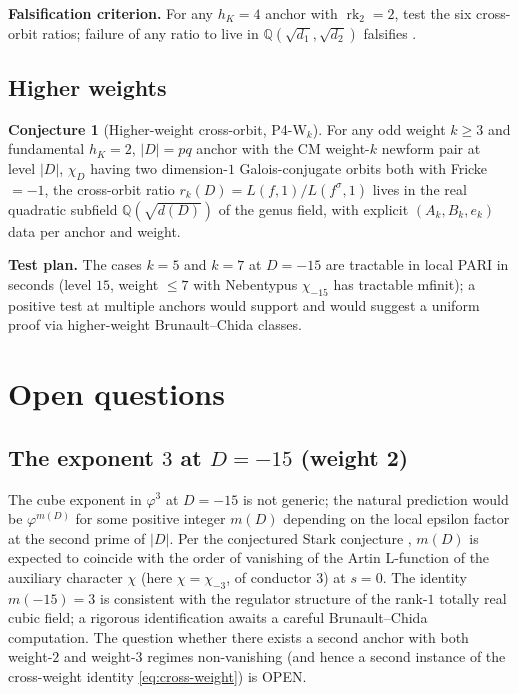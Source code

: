 \documentclass[11pt]{amsart}
\theoremstyle{definition}
\newtheorem{conjecture}[theorem]{Conjecture}
\theoremstyle{remark}
\DeclareMathOperator{\rk}{rk}
\newcommand{\Q}{\mathbb{Q}}
\newcommand{\chiD}{\chi_D}
\begin{document}
\textbf{Falsification criterion.} For any \(h_{K} = 4\) anchor with
\(\rk_{2} = 2\), test the six cross-orbit ratios; failure of any
ratio to live in \(\Q(\sqrt{d_{1}}, \sqrt{d_{2}})\) falsifies
.

\subsection{Higher weights}\label{ssec:ext-wt}

\begin{conjecture}[Higher-weight cross-orbit, P4-W\(_{k}\)]\label{conj:wk}
For any odd weight \(k \ge 3\) and fundamental \(h_{K} = 2\),
\(|D| = pq\) anchor with the CM weight-\(k\) newform pair at level
\(|D|\), \(\chiD\) having two dimension-\(1\) Galois-conjugate
orbits both with Fricke \(= -1\), the cross-orbit ratio
\(r_{k}(D) = L(f, 1)/L(f^{\sigma}, 1)\) lives in the real quadratic
subfield \(\Q(\sqrt{d(D)})\) of the genus field, with explicit
\((A_{k}, B_{k}, e_{k})\) data per anchor and weight.
\end{conjecture}

\textbf{Test plan.} The cases \(k = 5\) and \(k = 7\) at
\(D = -15\) are tractable in local PARI in seconds (level \(15\),
weight \(\le 7\) with Nebentypus \(\chi_{-15}\) has tractable
\textsf{mfinit}); a positive test at multiple anchors would
support  and would suggest a uniform proof via
higher-weight Brunault--Chida classes.


\section{Open questions}\label{sec:open}

\subsection{The exponent \(3\) at \(D = -15\) (weight 2)}

The cube exponent in \(\varphi^{3}\) at \(D = -15\) is not generic;
the natural prediction would be \(\varphi^{m(D)}\) for some
positive integer \(m(D)\) depending on the local epsilon factor at
the second prime of \(|D|\). Per the conjectured Stark conjecture
\cite{Stark1971,Stark1975,Stark1976,Stark1980,Tate1984}, \(m(D)\) is
expected to coincide with the order of vanishing of the Artin
L-function of the auxiliary character \(\chi\) (here
\(\chi = \chi_{-3}\), of conductor \(3\)) at \(s = 0\). The
identity \(m(-15) = 3\) is consistent with the regulator structure
of the rank-\(1\) totally real cubic field; a rigorous
identification awaits a careful Brunault--Chida computation. The
question whether there exists a second anchor with both weight-\(2\)
and weight-\(3\) regimes non-vanishing (and hence a second instance
of the cross-weight identity \eqref{eq:cross-weight}) is OPEN.
\end{document}
